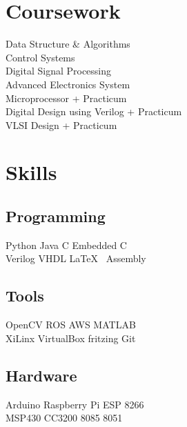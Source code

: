 \documentclass[]{deedy-resume-openfont}
\begin{document}
\begin{minipage}[t]{0.33\textwidth}

\section{Coursework}

Data Structure \& Algorithms \\
Control Systems \\
Digital Signal Processing \\
Advanced Electronics System \\
Microprocessor + Practicum \\
Digital Design using Verilog + Practicum \\
VLSI Design + Practicum \\
\sectionsep


\section{Skills}
\subsection{Programming}
Python \textbullet{} Java \textbullet{} C \textbullet{} Embedded C \\
Verilog \textbullet{} VHDL \textbullet{} \LaTeX\ \textbullet{} Assembly
\sectionsep

\subsection{Tools}
OpenCV \textbullet{} ROS \textbullet{} AWS \textbullet{} MATLAB \\
XiLinx \textbullet{} VirtualBox \textbullet{} fritzing \textbullet{} Git \\
\sectionsep


\subsection{Hardware}
Arduino \textbullet{} Raspberry Pi \textbullet{} ESP 8266 \\
MSP430 \textbullet{} CC3200 \textbullet{} 8085 \textbullet{} 8051
\sectionsep


\end{minipage}
\end{document}
